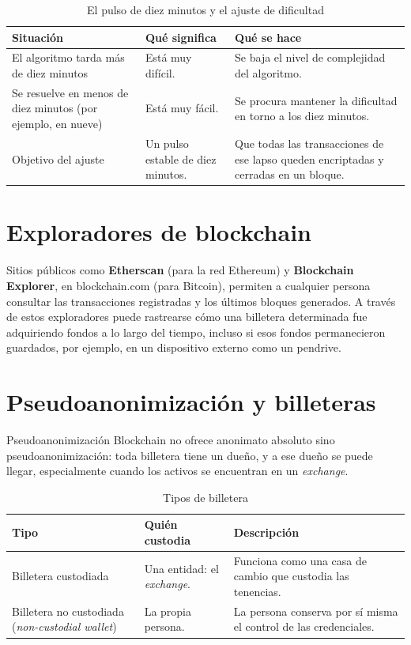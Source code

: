 \documentclass[12pt,oneside]{book}
\begin{document}
\begin{table}[H]
\centering
\caption{El pulso de diez minutos y el ajuste de dificultad}
\begin{tabular}{p{}p{}p{}}
\toprule
\textbf{Situación} & \textbf{Qué significa} & \textbf{Qué se hace} \\
\midrule
El algoritmo tarda más de diez minutos & Está muy difícil. & Se baja el nivel de complejidad del algoritmo. \\
Se resuelve en menos de diez minutos (por ejemplo, en nueve) & Está muy fácil. & Se procura mantener la dificultad en torno a los diez minutos. \\
Objetivo del ajuste & Un pulso estable de diez minutos. & Que todas las transacciones de ese lapso queden encriptadas y cerradas en un bloque. \\
\bottomrule
\end{tabular}
\end{table}

\section{Exploradores de blockchain}

Sitios públicos como \textbf{Etherscan} (para la red Ethereum) y \textbf{Blockchain Explorer}, en blockchain.com (para Bitcoin), permiten a cualquier persona consultar las transacciones registradas y los últimos bloques generados. A través de estos exploradores puede rastrearse cómo una billetera determinada fue adquiriendo fondos a lo largo del tiempo, incluso si esos fondos permanecieron guardados, por ejemplo, en un dispositivo externo como un pendrive.

\section{Pseudoanonimización y billeteras}

\begin{definition}{Pseudoanonimización}
Blockchain no ofrece anonimato absoluto sino pseudoanonimización: toda billetera tiene un dueño, y a ese dueño se puede llegar, especialmente cuando los activos se encuentran en un \textit{exchange}.
\end{definition}

\begin{table}[H]
\centering
\caption{Tipos de billetera}
\begin{tabular}{p{}p{}p{}}
\toprule
\textbf{Tipo} & \textbf{Quién custodia} & \textbf{Descripción} \\
\midrule
Billetera custodiada & Una entidad: el \textit{exchange}. & Funciona como una casa de cambio que custodia las tenencias. \\
Billetera no custodiada (\textit{non-custodial wallet}) & La propia persona. & La persona conserva por sí misma el control de las credenciales. \\
\bottomrule
\end{tabular}
\end{table}
\end{document}
